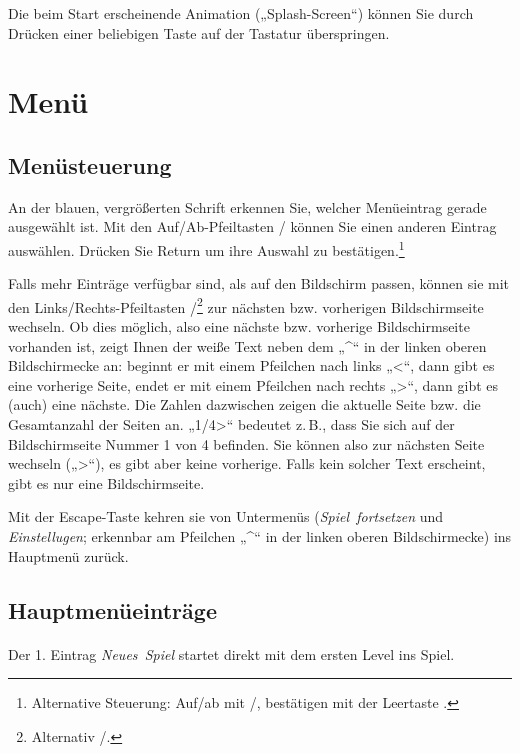 \documentclass[oneside,12pt]{scrartcl}
\newcommand{\ui}[1]{\mbox{\textit{#1}}}
\begin{document}
Die beim Start erscheinende Animation („Splash-Screen“) können Sie durch Drücken einer beliebigen Taste auf der Tastatur überspringen.

\section{Menü}

\subsection{Menüsteuerung}
An der blauen, vergrößerten Schrift erkennen Sie, welcher Menüeintrag gerade ausgewählt ist. Mit den Auf/Ab-Pfeiltasten \UArrow/\DArrow{} können Sie einen anderen Eintrag auswählen. Drücken Sie Return \Return um ihre Auswahl zu bestätigen.\footnote{Alternative Steuerung: Auf/ab mit /, bestätigen mit der Leertaste \Spacebar.}

Falls mehr Einträge verfügbar sind, als auf den Bildschirm passen, können sie mit den Links/Rechts-Pfeiltasten \LArrow/\RArrow{}\footnote{Alternativ /.} zur nächsten bzw. vorherigen Bildschirmseite wechseln. Ob dies möglich, also eine nächste bzw. vorherige Bildschirmseite vorhanden ist, zeigt Ihnen der weiße Text neben dem „\textasciicircum“ in der linken oberen Bildschirmecke an: beginnt er mit einem Pfeilchen nach links „<“, dann gibt es eine vorherige Seite, endet er mit einem Pfeilchen nach rechts „>“, dann gibt es (auch) eine nächste. Die Zahlen dazwischen zeigen die aktuelle Seite bzw. die Gesamtanzahl der Seiten an. „1/4>“ bedeutet z.\,B., dass Sie sich auf der Bildschirmseite Nummer 1 von 4 befinden. Sie können also zur nächsten Seite wechseln („>“), es gibt aber keine vorherige. Falls kein solcher Text erscheint, gibt es nur eine Bildschirmseite.

Mit der Escape-Taste \Esc kehren sie von Untermenüs (\ui{Spiel fortsetzen} und \ui{Einstellugen}; erkennbar am Pfeilchen „\textasciicircum“ in der linken oberen Bildschirmecke) ins Hauptmenü zurück.

\subsection{Hauptmenüeinträge}
\paragraph{} Der 1. Eintrag \ui{Neues Spiel} startet direkt mit dem ersten Level ins Spiel.
\end{document}
